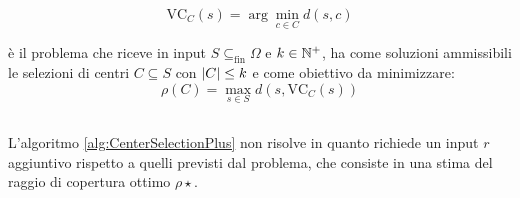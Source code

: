 \begin{equation*}
	\text{VC}_C(s)=\arg\min_{c\in C} d(s,c)
\end{equation*}

\CenterSelection è il problema che riceve in input $S\subseteq_\text{fin}\Omega$ e $k\in\mathbb N^+$, ha come soluzioni ammissibili le selezioni di centri $C\subseteq S$ con $| C |\leq k$ e come obiettivo da minimizzare:
\begin{equation*}
	\rho(C)=\max_{s\in S} d(s,\text{VC}_C(s))
\end{equation*}

\subsection{\CenterSelectionPlus}
L'algoritmo \ref{alg:CenterSelectionPlus} non risolve \CenterSelection in quanto richiede un input $r$ aggiuntivo rispetto a quelli previsti dal problema, che consiste in una stima del raggio di copertura ottimo $\rho\star$.

\begin{algorithm}[ht]
	\caption{\CenterSelectionPlus}
	\label{alg:CenterSelectionPlus}
	
\end{algorithm}

